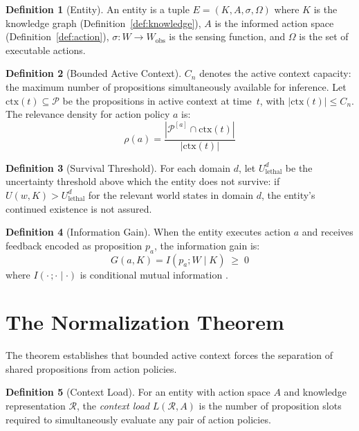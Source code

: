 \documentclass[11pt]{article}
\theoremstyle{definition}
\newtheorem{definition}{Definition}
\theoremstyle{remark}
\begin{document}
\begin{definition}[Entity]
\label{def:entity}
An entity is a tuple $E = (K, A, \sigma, \Omega)$ where $K$ is the knowledge
graph (Definition~\ref{def:knowledge}), $A$ is the informed action space
(Definition~\ref{def:action}), $\sigma : W \to W_{\text{obs}}$ is the
sensing function, and $\Omega$ is the set of executable actions.
\end{definition}

\begin{definition}[Bounded Active Context]
\label{def:context}
$C_n$ denotes the active context capacity: the maximum number of
propositions simultaneously available for inference. Let
$\mathrm{ctx}(t) \subseteq \mathcal{P}$ be the propositions in active
context at time~$t$, with $|\mathrm{ctx}(t)| \leq C_n$. The relevance
density for action policy $a$ is:
\[
\rho(a) = \frac{|\mathcal{P}^{[a]} \cap \mathrm{ctx}(t)|}{|\mathrm{ctx}(t)|}
\]
\end{definition}

\begin{definition}[Survival Threshold]
\label{def:survival}
For each domain $d$, let $U_{\text{lethal}}^d$ be the uncertainty
threshold above which the entity does not survive: if $U(w, K) >
U_{\text{lethal}}^d$ for the relevant world states in domain $d$, the
entity's continued existence is not assured.
\end{definition}

\begin{definition}[Information Gain]
\label{def:infogain}
When the entity executes action $a$ and receives feedback encoded as
proposition $p_a$, the information gain is:
\[
G(a, K) = I(p_a ; W \mid K) \;\geq\; 0
\]
where $I(\cdot\,;\cdot \mid \cdot)$ is conditional mutual information
\cite{Cover2006}.
\end{definition}

\section{The Normalization Theorem}
\label{sec:theorem}

The theorem establishes that bounded active context forces the
separation of shared propositions from action policies.

\begin{definition}[Context Load]
\label{def:load}
For an entity with action space $A$ and knowledge representation $\mathcal{R}$,
the \emph{context load} $L(\mathcal{R}, A)$ is the number of proposition
slots required to simultaneously evaluate any pair of action policies.
\end{definition}
\end{document}
